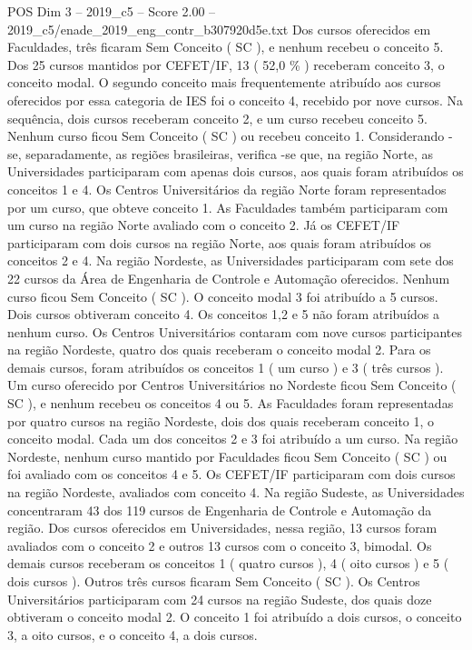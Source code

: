 \begin{textsample}{POS Dim 3 – 2019\_c5 – Score 2.00 – 2019\_c5/enade\_2019\_eng\_contr\_b307920d5e.txt}
Dos cursos oferecidos em Faculdades, três ficaram Sem Conceito ( SC ), e nenhum recebeu o conceito 5.
Dos 25 cursos mantidos por CEFET/IF, 13 ( 52,0 \% ) receberam conceito 3, o conceito modal.
O segundo conceito mais frequentemente atribuído aos cursos oferecidos por essa categoria de IES foi o conceito 4, recebido por nove cursos.
Na sequência, dois cursos receberam conceito 2, e um curso recebeu conceito 5.
Nenhum curso ficou Sem Conceito ( SC ) ou recebeu conceito 1.
Considerando -se, separadamente, as regiões brasileiras, verifica -se que, na região Norte, as Universidades participaram com apenas dois cursos, aos quais foram atribuídos os conceitos 1 e 4.
Os Centros Universitários da região Norte foram representados por um curso, que obteve conceito 1.
As Faculdades também participaram com um curso na região Norte avaliado com o conceito 2.
Já os CEFET/IF participaram com dois cursos na região Norte, aos quais foram atribuídos os conceitos 2 e 4.
Na região Nordeste, as Universidades participaram com sete dos 22 cursos da Área de Engenharia de Controle e Automação oferecidos.
Nenhum curso ficou Sem Conceito ( SC ).
O conceito modal 3 foi atribuído a 5 cursos.
Dois cursos obtiveram conceito 4.
Os conceitos 1,2 e 5 não foram atribuídos a nenhum curso.
Os Centros Universitários contaram com nove cursos participantes na região Nordeste, quatro dos quais receberam o conceito modal 2.
Para os demais cursos, foram atribuídos os conceitos 1 ( um curso ) e 3 ( três cursos ).
Um curso oferecido por Centros Universitários no Nordeste ficou Sem Conceito ( SC ), e nenhum recebeu os conceitos 4 ou 5.
As Faculdades foram representadas por quatro cursos na região Nordeste, dois dos quais receberam conceito 1, o conceito modal.
Cada um dos conceitos 2 e 3 foi atribuído a um curso.
Na região Nordeste, nenhum curso mantido por Faculdades ficou Sem Conceito ( SC ) ou foi avaliado com os conceitos 4 e 5.
Os CEFET/IF participaram com dois cursos na região Nordeste, avaliados com conceito 4.
Na região Sudeste, as Universidades concentraram 43 dos 119 cursos de Engenharia de Controle e Automação da região.
Dos cursos oferecidos em Universidades, nessa região, 13 cursos foram avaliados com o conceito 2 e outros 13 cursos com o conceito 3, bimodal.
Os demais cursos receberam os conceitos 1 ( quatro cursos ), 4 ( oito cursos ) e 5 ( dois cursos ).
Outros três cursos ficaram Sem Conceito ( SC ).
Os Centros Universitários participaram com 24 cursos na região Sudeste, dos quais doze obtiveram o conceito modal 2.
O conceito 1 foi atribuído a dois cursos, o conceito 3, a oito cursos, e o conceito 4, a dois cursos.

\end{textsample}
